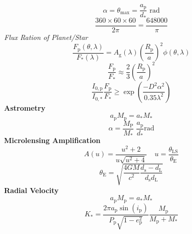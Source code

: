 \documentclass{spy}
\begin{document}
\begin{equation}
\alpha = \theta_\mathrm{max} = \frac{a_\mathrm{p}}{d_\mathrm{*}} \text{ rad}
\end{equation}
\begin{equation}
\frac{360 \times 60 \times 60}{2 \pi} = \frac{648000}{\pi}
\end{equation}
\textit{Flux Ration of Planet/Star}
\begin{equation}
\frac{F_\mathrm{p}(\theta, \lambda)}{F_\mathrm{*}(\lambda)} = A_\mathrm{g}(\lambda) \left( \frac{R_\mathrm{p}}{a} \right)^2 \phi(\theta, \lambda)
\end{equation}
\begin{equation}
\frac{F_\mathrm{p}}{F_\mathrm{*}} \approx \frac{2}{3} \left( \frac{R_\mathrm{p}}{a} \right)^2
\end{equation}
\begin{equation}
\frac{I_\mathrm{0, p}}{I_\mathrm{0, *}} \frac{F_\mathrm{p}}{F_\mathrm{*}} \geq \exp \left( \frac{-D^2 \alpha^2}{0.35 \lambda^2} \right)
\end{equation}
\textbf{Astrometry}
\begin{equation}
a_\mathrm{p} M_\mathrm{p} = a_\mathrm{*} M_\mathrm{*}
\end{equation}
\begin{equation}
\alpha  = \frac{M_\mathrm{P}}{M_\mathrm{*}} \; \frac{a_\mathrm{p}}{d_\mathrm{*}} \mathrm{rad}
\end{equation}
\textbf{Microlensing Amplification}
\begin{equation}
A(u) = \frac{u^2 + 2}{u \sqrt{u^2 + 4}} \; \; \; \; u = \frac{\theta_\mathrm{LS}}{\theta_\mathrm{E}}
\end{equation}
\begin{equation}
\theta_\mathrm{E} = \sqrt{\frac{4GM}{c^2} \frac{d_\mathrm{s} - d_\mathrm{L}}{d_\mathrm{s} d_\mathrm{L}}}
\end{equation}
\textbf {Radial Velocity}
\begin{equation}
a_\mathrm{p} M_\mathrm{p} = a_\mathrm{*} M_\mathrm{*}
\end{equation}
\begin{equation}
K_\mathrm{*} = \frac {2 \pi a_\mathrm{p} \sin(i_\mathrm{p})} {P_\mathrm{p} \sqrt {1-e_\mathrm{p}^2}} \frac {M_\mathrm{p}} {M_\mathrm{p} + M_\mathrm{*}}
\end{equation}
\end{document}
